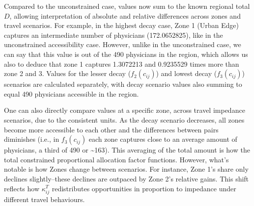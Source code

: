 \documentclass[
  10pt,
  letterpaper,
]{article}
\begin{document}
\begin{table}

\caption{\label{tbl-simple-example-total-opportunity-accessibility}Simple
system: total constrained accessible opportunities.}


\end{table}%

Compared to the unconstrained case, values now sum to the known regional
total \(D\), allowing interpretation of absolute and relative
differences across zones and travel scenarios. For example, in the
highest decay case, Zone 1 (Urban Edge) captures an intermediate number
of physicians (172.0652825), like in the unconstrained accessibility
case. However, unlike in the unconstrained case, we can say that this
value is out of the 490 physicians in the region, which allows us also
to deduce that zone 1 captures 1.3072213 and 0.9235529 times more than
zone 2 and 3. Values for the lesser decay (\(f_2(c_{ij})\)) and lowest
decay (\(f_3(c_{ij})\)) scenarios are calculated separately, with decay
scenario values also summing to equal 490 physicians accessible in the
region.

One can also directly compare values at a specific zone, across travel
impedance scenarios, due to the consistent units. As the decay scenario
decreases, all zones become more accessible to each other and the
differences between pairs diminishes (i.e., in \(f_3(c_{ij})\) each zone
captures close to an average amount of physicians, a third of 490 or
\textasciitilde163). This averaging of the total amount is how the total
constrained proportional allocation factor functions. However, what's
notable is how Zones change between scenarios. For instance, Zone 1's
share only declines slightly--these declines are outpaced by Zone 2's
relative gains. This shift reflects how \(\kappa_{ij}^T\) redistributes
opportunities in proportion to impedance under different travel
behaviours.
\end{document}
